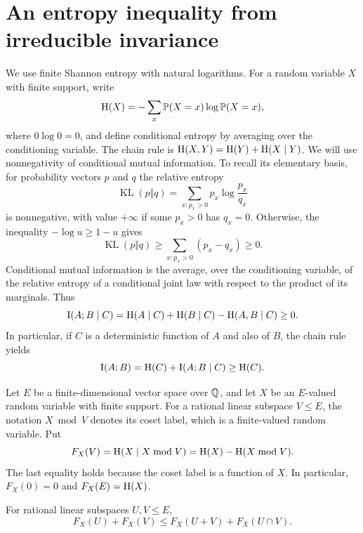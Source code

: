 \section{An entropy inequality from irreducible invariance}
\label{sec:entropy}

We use finite Shannon entropy with natural logarithms.  For a random
variable $X$ with finite support, write
\[
  \operatorname{H}(X)=-\sum_x \mathbb P(X=x)\log\mathbb P(X=x),
\]
where $0\log 0=0$, and define conditional entropy by averaging over the
conditioning variable.  The chain rule is
$\operatorname{H}(X,Y)=\operatorname{H}(Y)+\operatorname{H}(X\mid Y)$.
We will use nonnegativity of conditional mutual information.  To recall
its elementary basis, for probability vectors $p$ and $q$ the relative
entropy
\[
  \operatorname{KL}(p\Vert q)=\sum_{x:p_x>0}p_x\log\frac{p_x}{q_x}
\]
is nonnegative, with value $+\infty$ if some $p_x>0$ has $q_x=0$.
Otherwise, the inequality $-\log u\geq 1-u$ gives
\[
  \operatorname{KL}(p\Vert q)
  \geq \sum_{x:p_x>0}(p_x-q_x)\geq 0.
\]
Conditional mutual information is the average, over the conditioning
variable, of the relative entropy of a conditional joint law with
respect to the product of its marginals.  Thus
\[
  \operatorname{I}(A;B\mid C)
  =\operatorname{H}(A\mid C)+\operatorname{H}(B\mid C)-\operatorname{H}(A,B\mid C)\geq 0.
\]
In particular, if $C$ is a deterministic function of $A$ and also of $B$,
the chain rule yields
\begin{equation}
  \operatorname{I}(A;B)
  =\operatorname{H}(C)+\operatorname{I}(A;B\mid C)\geq\operatorname{H}(C).
  \label{eq:common-quotient-information}
\end{equation}

Let $E$ be a finite-dimensional vector space over $\mathbb Q$, and let $X$ be
an $E$-valued random variable with finite support.  For a rational linear
subspace $V\leq E$, the notation $X\bmod V$ denotes its coset label,
which is a finite-valued random variable.  Put
\begin{equation}
  F_X(V)=\operatorname{H}(X\mid X\bmod V)
        =\operatorname{H}(X)-\operatorname{H}(X\bmod V).
  \label{eq:quotient-entropy}
\end{equation}
The last equality holds because the coset label is a function of $X$.
In particular, $F_X(0)=0$ and $F_X(E)=\operatorname{H}(X)$.

\begin{lemma}[Supermodularity]
\label{lem:supermodular}
For rational linear subspaces $U,V\leq E$,
\begin{equation}
  F_X(U)+F_X(V)
  \leq F_X(U+V)+F_X(U\cap V).
  \label{eq:entropy-supermodularity}
\end{equation}
\end{lemma}

